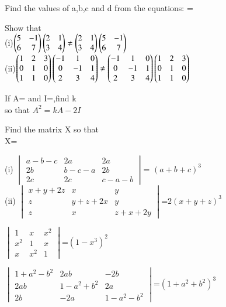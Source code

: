 \item Find the values of a,b,c and d from the equations:  = 
\item Show that\\
(i)$\begin{pmatrix}5 &-1\\6 &7\end{pmatrix}\begin{pmatrix}2 &1\\3 &4\end{pmatrix}\neq\begin{pmatrix}2 &1\\3 &4\end{pmatrix}\begin{pmatrix}5 &-1\\6 &7\end{pmatrix}$
\\
(ii)$\begin{pmatrix}1 &2 &3\\0 &1 &0\\1 &1 &0\end{pmatrix}\begin{pmatrix}-1 &1 &0\\0 &-1 &1\\2 &3 &4\end{pmatrix}\neq \begin{pmatrix}-1 &1 &0\\0 &-1 &1\\2 &3 &4\end{pmatrix}\begin{pmatrix}1 &2 &3\\0 &1 &0\\1 &1 &0\end{pmatrix}$\\
\item If A= and I=,find k\\
 so that $A^2=kA-2I$\\
  \item Find the matrix X so that\\ X=\\
\item (i) $\begin{vmatrix}a-b-c& 2a& 2a \\ 2b& b-c-a& 2b \\ 2c& 2c& c-a-b\end{vmatrix}$= $(a+b+c)^3$\\
(ii) $\begin{vmatrix}x+y+2z&x&y \\ z&y+z+2x&y \\ z&x&z+x+2y\end{vmatrix}$=$2(x+y+z)^3$
\item $\begin{vmatrix}1&x&x^2 \\ x^2&1&x \\ x&x^2&1\end{vmatrix}$=$(1-x^3)^2$ 
\item $\begin{vmatrix}1+a^2-b^2&2ab&-2b \\ 2ab&1-a^2+b^2&2a \\ 2b&-2a&1-a^2-b^2\end{vmatrix}$=$(1+a^2+b^2)^3$
